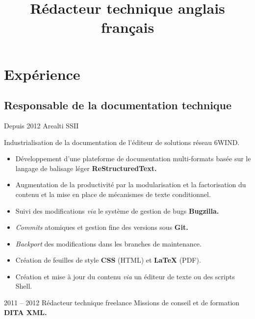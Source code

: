 \documentclass[12pt,a4paper,roman]{moderncv}
\title
    {Rédacteur technique anglais français}
\begin{document}
\makecvtitle %


\section{Expérience}

\subsection{Responsable de la documentation technique}

\cventry
    {Depuis 2012}
    {Arealti}
    {SSII}
    {}
    {}
    {Industrialisation de la documentation de l'éditeur de solutions réseau
      6WIND.
      \begin{itemize}
      \item Développement d'une plateforme de documentation multi-formats
        basée sur le langage de balisage léger \textbf{ReStructuredText.}
      \item Augmentation de la productivité par la modularisation et la
        factorisation du contenu et la mise en place de mécanismes de texte
        conditionnel.
      \item Suivi des modifications \emph{via} le système de gestion de
        bugs \textbf{Bugzilla.}
      \item \emph{Commits} atomiques et gestion fine des versions sous
        \textbf{Git.}
      \item \emph{Backport} des modifications dans les branches de
        maintenance.
      \item Création de feuilles de style \textbf{CSS} (HTML) et
        \textbf{\LaTeX} (PDF).
      \item Création et mise à jour du contenu \emph{via} un éditeur de texte
        ou des scripts Shell.
      \end{itemize}
    }


\cventry
    {2011 – 2012}
    {Rédacteur technique freelance}
    {\textsc{}}
    {}
    {}
    {Missions de conseil et de formation \textbf{DITA XML.}}

\end{document}
